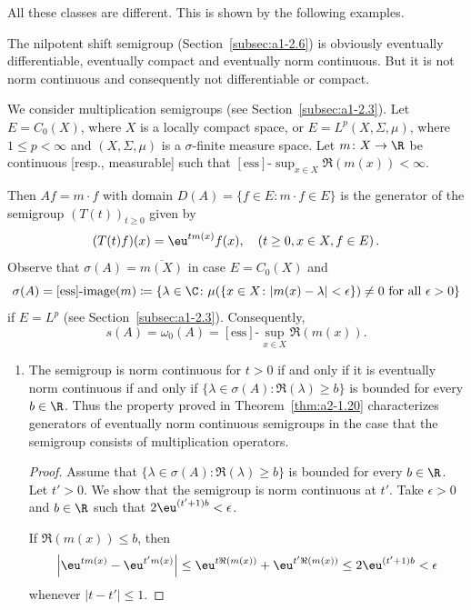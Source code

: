 All these classes are different.
This is shown by the following examples.
\begin{example}\label{ex:a2-1.27}
The nilpotent shift semigroup (Section~\ref{subsec:a1-2.6}) is obviously eventually differentiable, eventually compact and eventually norm continuous.
But it is not norm continuous and consequently not differentiable or compact.
\end{example}

\begin{example}\label{ex:a2-1.28}
We consider multiplication semigroups (see Section~\ref{subsec:a1-2.3}).
Let $E = C_{0}(X)$, where $X$ is a locally compact space, or $E = L^{p}(X,\Sigma,\mu)$, where $1 \leq p < \infty$ and $(X,\Sigma,\mu)$ is a $\sigma$-finite measure space.
Let $m \colon X \to \R$ be continuous [resp., measurable] such that $[\text{ess}]\text{-}\sup_{x \in X} \Re(m(x)) < \infty$.

Then $Af = m \cdot f$ with domain $D(A) = \{f \in E \colon m \cdot f \in E\}$ is the generator of the semigroup $(T(t))_{t \geq 0}$ given by
\[
    (T(t)f)(x) = \eu^{tm(x)}f(x), \quad (t \geq 0, x \in X, f \in E )\, .
\]
Observe that $\sigma(A) = \overline{m(X)}$ in case $E = C_{0}(X)$ 
and 
\[
\sigma(A) = [\text{ess}]\text{-}\text{image}(m) \coloneqq \{\lambda \in \C \colon \mu(\{x \in X \colon |m(x)-\lambda| < \epsilon\}) \neq 0 \text{ for all } \epsilon > 0\}
\]
if\/ $E = L^{p}$ (see Section~\ref{subsec:a1-2.3}).
Consequently, 
%
\[
	s(A) = \omega_{0}(A) = [\text{ess}]\text{-}\sup_{x \in X} \Re(m(x)).
\]
%
\begin{enumerate}[\upshape (i), wide, labelindent=.25em]
\item \label{ex:a2-1.28-1}
The semigroup is norm continuous for $t > 0$ if and only if it is eventually norm continuous if and only if 
$\{\lambda \in \sigma(A) \colon \Re(\lambda) \geq b\}$ 
is bounded for every $b \in \R$.
Thus the property proved in Theorem~\ref{thm:a2-1.20}   characterizes generators of eventually norm continuous semigroups in the case that the semigroup consists of multiplication operators.

\begin{proof}
Assume that $\{\lambda \in \sigma(A) \colon \Re(\lambda) \geq b\}$ is bounded for every $b \in \R$.
Let $t' > 0$.
We show that the semigroup is norm continuous at $t'$.
Take $\epsilon > 0$ and $b \in \R$ such that $2\eu^{(t'+1)b} < \epsilon$.

If\/ $\Re(m(x)) \leq b$, then
\[
    \left|\eu^{tm(x)} - \eu^{t'm(x)}\right| \leq \eu^{t\Re(m(x))} + \eu^{t'\Re(m(x))} \leq 2\eu^{(t'+1)b} < \epsilon
\]
whenever $|t-t'| \leq 1$.


\end{proof}
\end{enumerate}
\end{example}
